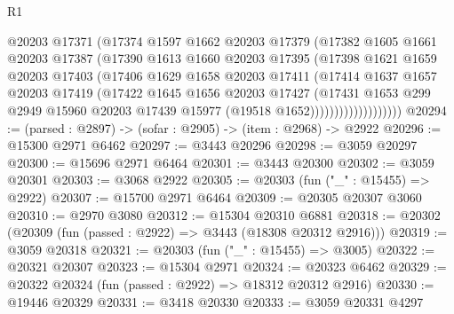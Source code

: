 \begin{lexlean}{R1}
\begin{coremodule}
                        @20203
                        @17371
                        (@17374
                          @1597
                          @1662
                          @20203
                          @17379
                          (@17382
                            @1605
                            @1661
                            @20203
                            @17387
                            (@17390
                              @1613
                              @1660
                              @20203
                              @17395
                              (@17398
                                @1621
                                @1659
                                @20203
                                @17403
                                (@17406
                                  @1629
                                  @1658
                                  @20203
                                  @17411
                                  (@17414
                                    @1637
                                    @1657
                                    @20203
                                    @17419
                                    (@17422
                                      @1645
                                      @1656
                                      @20203
                                      @17427
                                      (@17431
                                        @1653
                                        @299
                                        @2949
                                        @15960
                                        @20203
                                        @17439
                                        @15977
                                        (@19518 @1652)))))))))))))))))))
@20294 := (parsed : @2897) -> (sofar : @2905) -> (item : @2968) -> @2922
@20296 := @15300 @2971 @6462
@20297 := @3443 @20296
@20298 := @3059 @20297
@20300 := @15696 @2971 @6464
@20301 := @3443 @20300
@20302 := @3059 @20301
@20303 := @3068 @2922
@20305 := @20303 (fun ("_" : @15455) => @2922)
@20307 := @15700 @2971 @6464
@20309 := @20305 @20307 @3060
@20310 := @2970 @3080
@20312 := @15304 @20310 @6881
@20318 := @20302 (@20309 (fun (passed : @2922) => @3443 (@18308 @20312 @2916)))
@20319 := @3059 @20318
@20321 := @20303 (fun ("_" : @15455) => @3005)
@20322 := @20321 @20307
@20323 := @15304 @2971
@20324 := @20323 @6462
@20329 := @20322 @20324 (fun (passed : @2922) => @18312 @20312 @2916)
@20330 := @19446 @20329
@20331 := @3418 @20330
@20333 := @3059 @20331 @4297

\end{coremodule}
\end{lexlean}
